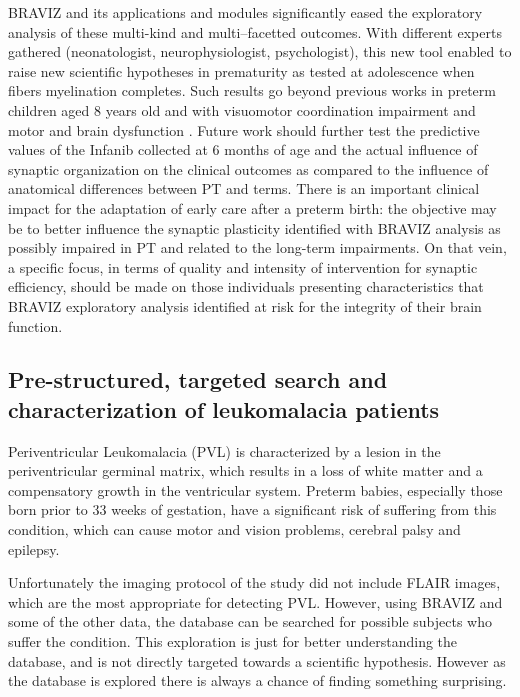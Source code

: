 \documentclass[twocolumn]{svjour3}
\begin{document}
BRAVIZ and its applications and modules significantly eased the exploratory analysis of these multi-kind and multi–facetted outcomes. With different experts gathered (neonatologist, neurophysiologist, psychologist), this new tool enabled to raise new scientific hypotheses in prematurity as tested at adolescence when fibers myelination completes. Such results go beyond previous works in preterm children aged 8 years old and with visuomotor coordination impairment and motor and brain dysfunction \cite{schneider_visuo-motor_2008,flamand_brain_2012}. Future work should further test the predictive values of the Infanib collected at 6 months of age and the actual influence of synaptic organization on the clinical outcomes as compared to the influence of anatomical differences between PT and terms. There is an important clinical impact for the adaptation of early care after a preterm birth: the objective may be to better influence the synaptic plasticity identified with BRAVIZ analysis as possibly impaired in PT and related to the long-term impairments. On that vein, a specific focus, in terms of quality and intensity of intervention for synaptic efficiency, should be made on those individuals presenting characteristics that BRAVIZ exploratory analysis identified at risk for the integrity of their brain function.

  
\subsection{Pre-structured, targeted search and characterization of leukomalacia patients}
\label{sec_pvm_case}
Periventricular Leukomalacia (PVL) is characterized by a lesion in the periventricular germinal matrix, which results in a loss of white matter and a compensatory growth in the ventricular system. Preterm babies, especially those born prior to 33 weeks of gestation, have a significant risk of suffering from this condition, which can cause motor and vision problems, cerebral palsy and epilepsy.    

Unfortunately the imaging protocol of the study did not include FLAIR images, which are the most appropriate for detecting PVL. However, using BRAVIZ and some of the other data, the database can be searched for possible subjects who suffer the condition. This exploration is just for better understanding the database, and is not directly targeted towards a scientific hypothesis. However as the database is explored there is always a chance of finding something surprising.
\end{document}
